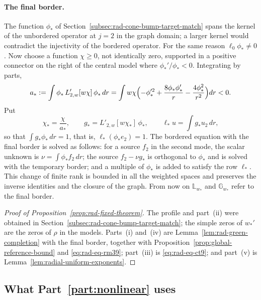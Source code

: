 \paragraph{The final border.}
The function $\phi_*$ of
Section~\ref{subsec:rad-cone-bump-target-match} spans the kernel of
the unbordered operator at $j=2$ in the graph domain; a larger kernel
would contradict the injectivity of the bordered operator. For the
same reason $\ell_0\phi_*\ne0$. Now choose a function $\chi\ge0$, not
identically zero, supported in a positive connector on the right of
the central model where $\phi_*'/\phi_*<0$. Integrating by parts,
\begin{equation}\label{eq:ct-positive-shape}
 a_*:=\int\phi_*\,L'_{2,w}[w\chi]\,\phi_*\,dr
 =\int w\chi\Bigl(-\phi_*'^2+\frac{8\phi_*\phi_*'}r
                              -\frac{4\phi_*^2}{r^2}\Bigr)dr<0 .
\end{equation}
Put
\begin{equation}\label{eq:rad-eq-ct9}
 \chi_*=\frac{\chi}{a_*},\qquad
 g_*=L'_{2,w}[w\chi_*]\,\phi_*,\qquad
 \ell_*u=\int g_*u_2\,dr ,
\end{equation}
so that $\int g_*\phi_*\,dr=1$, that is,
$\ell_*(\phi_*e_2)=1$. The bordered equation with the final border is
solved as follows: for a source $f_2$ in the second mode, the scalar
unknown is $\nu=\int\phi_*f_2\,dr$; the source $f_2-\nu g_*$ is
orthogonal to $\phi_*$ and is solved with the temporary border; and a
multiple of $\phi_*$ is added to satisfy the row $\ell_*$. This change
of finite rank is bounded in all the weighted spaces and preserves the
inverse identities and the closure of the graph. From now on
$\mathbb L_{w_*}$ and $\mathbb G_{w_*}$ refer to the final border.

\begin{proof}[Proof of Proposition~\ref{prop:rad-fixed-theorem}]
The profile and part~(ii) were obtained in
Section~\ref{subsec:rad-cone-bump-target-match}; the simple zeros of
$w_*'$ are the zeros of $\rho$ in the models. Parts~(i) and~(iv)
are Lemma~\ref{lem:rad-green-completion} with the final border,
together with Proposition~\ref{prop:global-reference-bound} and
\eqref{eq:rad-eq-rm39}; part~(iii) is \eqref{eq:rad-eq-ct9}; and
part~(v) is Lemma~\ref{lem:radial-uniform-exponents}.
\end{proof}

\subsection{What Part~\ref{part:nonlinear} uses}
\label{subsec:interface}


